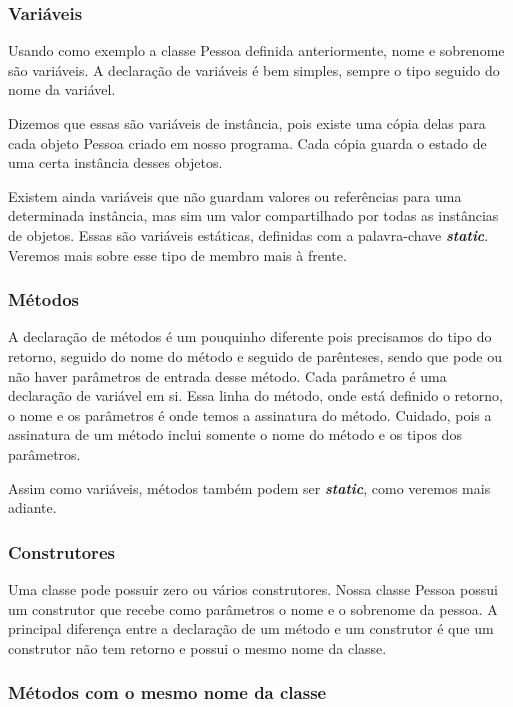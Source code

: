 \documentclass[12pt]{article}
\begin{document}
\subsubsection{Variáveis}

Usando como exemplo a classe Pessoa definida anteriormente, nome e sobrenome são variáveis. A declaração de variáveis é bem simples, sempre o tipo seguido do nome da variável.

Dizemos que essas são variáveis de instância, pois existe uma cópia delas para cada objeto Pessoa criado em nosso programa. Cada cópia guarda o estado de uma certa instância desses objetos.

Existem ainda variáveis que não guardam valores ou referências para uma determinada instância, mas sim um valor compartilhado por todas as instâncias de objetos. Essas são variáveis estáticas, definidas com a palavra-chave \textbf{\textit{static}}. Veremos mais sobre esse tipo de membro mais à frente.

\subsubsection{Métodos}

A declaração de métodos é um pouquinho diferente pois precisamos do tipo do retorno, seguido do nome do método e seguido de parênteses, sendo que pode ou não haver parâmetros de entrada desse método. Cada parâmetro é uma declaração de variável em si. Essa linha do método, onde está definido o retorno, o nome e os parâmetros é onde temos a assinatura do método. Cuidado, pois a assinatura de um método inclui somente o nome do método e os tipos dos parâmetros.

Assim como variáveis, métodos também podem ser \textbf{\textit{static}}, como veremos mais adiante.

\subsubsection{Construtores}

Uma classe pode possuir zero ou vários construtores. Nossa classe Pessoa possui um construtor que recebe como parâmetros o nome e o sobrenome da pessoa. A principal diferença entre a declaração de um método e um construtor é que um construtor não tem retorno e possui o mesmo nome da classe.

\subsubsection{Métodos com o mesmo nome da classe}
\end{document}
